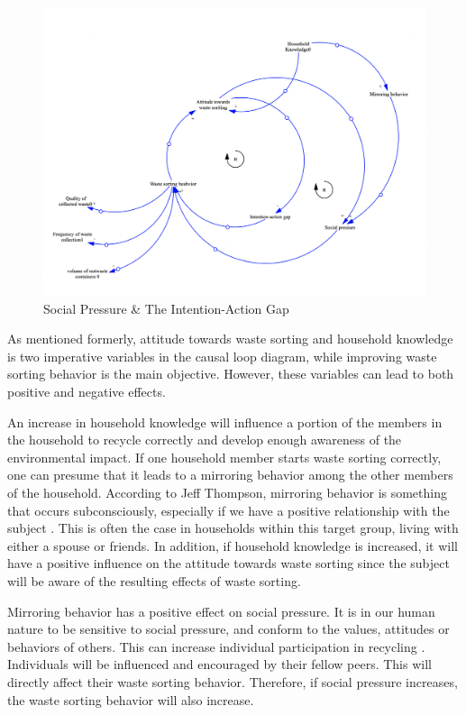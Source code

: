 \begin{figure}[H]
\centering
\includegraphics [scale=0.28,angle=360]{figures/socialpressure.png}
\caption{Social Pressure \& The Intention-Action Gap}
\label{fig:Social Pressure}
\end{figure}

\indent \newline
As mentioned formerly, attitude towards waste sorting and household knowledge is two imperative variables in the causal loop diagram, while improving waste sorting behavior is the main objective. However, these variables can lead to both positive and negative effects. 

\indent \newline
An increase in household knowledge will influence a portion of the members in the household to recycle correctly and develop enough awareness of the environmental impact. If one household member starts waste sorting correctly, one can presume that it leads to a mirroring behavior among the other members of the household. According to Jeff Thompson, mirroring behavior is something that occurs subconsciously, especially if we have a positive relationship with the subject \cite{mimicry}. This is often the case in households within this target group, living with either a spouse or friends. In addition, if household knowledge is increased, it will have a positive influence on the attitude towards waste sorting since the subject will be aware of the resulting effects of waste sorting.

\indent \newline
Mirroring behavior has a positive effect on social pressure. It is in our human nature to be sensitive to social pressure, and conform to the values, attitudes or behaviors of others. This can increase individual participation in recycling \cite{shackel}. Individuals will be influenced and encouraged by their fellow peers. This will directly affect their waste sorting behavior. Therefore, if social pressure increases, the waste sorting behavior will also increase.  

